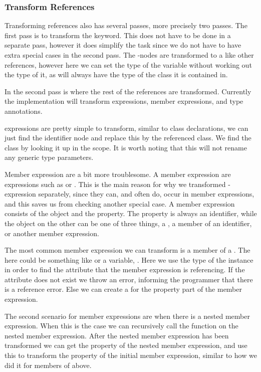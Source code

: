 \subsubsection{Transform References}

Transforming references also has several passes, more precisely two passes.
The first pass is to transform the  keyword.
This does not have to be done in a separate pass, however it does simplify the task since we do not have to have extra special cases in the second pass.
The -nodes are transformed to a  like other references, however here we can set the type of the variable without working out the type of it, as  will always have the type of the class it is contained in.

In the second pass is where the rest of the references are transformed.
Currently the implementation will transform  expressions, member expressions, and type annotations.

 expressions are pretty simple to transform, similar to class declarations, we can just find the identifier node and replace this by the referenced class.
We find the class by looking it up in the scope.
It is worth noting that this will not rename any generic type parameters.

Member expression are a bit more troublesome.
A member expression are expressions such as  or .
This is the main reason for why we transformed -expression separately, since they can, and often do, occur in member expressions, and this saves us from checking another special case.
A member expression consists of the object and the property.
The property is always an identifier, while the object on the other can be one of three things, a , a member of an identifier, or another member expression.

The most common member expression we can transform is a member of a .
The  here could be something like  or a variable, .
Here we use the type of the  instance in order to find the attribute that the member expression is referencing.
If the attribute does not exist we throw an error, informing the programmer that there is a reference error.
Else we can create a  for the property part of the member expression.

The second scenario for member expressions are when there is a nested member expression.
When this is the case we can recursively call the function on the nested member expression.
After the nested member expression has been transformed we can get the property of the nested member expression, and use this to transform the property of the initial member expression, similar to how we did it for members of  above.

